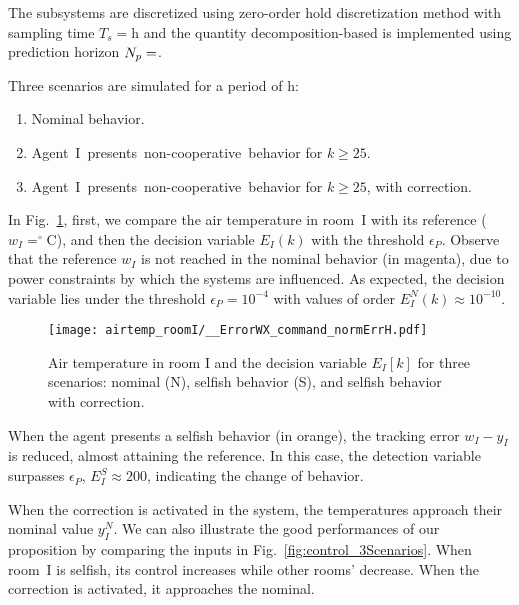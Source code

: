 \documentclass{ifacconf}  %
\begin{document}
The subsystems are discretized using zero-order hold discretization method with sampling time
${T_{s}=\mathrm{h}}$
and the quantity decomposition-based \dmpc{} is implemented using prediction horizon ${N_{p}=}$.

Three scenarios are simulated for a period of $\mathrm{h}$:

  \begin{enumerate}
    \item Nominal behavior.
    \item \mbox{Agent I presents non-cooperative behavior} for ${k\geq25}$.
    \item \mbox{Agent I presents non-cooperative behavior} for ${k\geq25}$, with correction.
  \end{enumerate}

In Fig.~\ref{fig:response3Scenarios}, first, we compare the air temperature in room~I
with its reference (${w_{I}=^{\circ}}$C), and then the
decision variable ${E_{I}(k)}$ with the threshold $\epsilon_{P}$.
Observe that the reference $w_{I}$ is not reached in the nominal behavior (in magenta),
due to power constraints by which the systems are influenced.
As expected, the decision variable lies under the threshold ${\epsilon_{P}=10^{-4}}$ with values of order ${E_{I}^{N}(k)\approx10^{-10}}$.
\begin{figure}[h]
  \centering
 \texttt{[image: airtemp\_roomI/\_\_ErrorWX\_command\_normErrH.pdf]}
  \caption{Air temperature in room I and the decision variable $E_{I}[k]$ for three scenarios: nominal (N), selfish behavior (S),
and selfish behavior with correction.}\label{fig:response3Scenarios}
\end{figure}

When the agent presents a selfish behavior (in orange), the tracking error
${w_{I}-y_{I}}$ is reduced, almost attaining the reference.
In this case, the detection variable surpasses $\epsilon_{P}$,
${E_{I}^{S}\approx200}$, indicating the change of behavior.

When the correction is activated in the system, the temperatures approach their nominal value $y_{I}^{N}$.
We can also illustrate the good performances of our proposition by comparing the inputs in Fig.~\ref{fig:control_3Scenarios}.
When room~I is selfish, its control increases while other rooms' decrease. When the correction is activated, it approaches the nominal.
\end{document}
